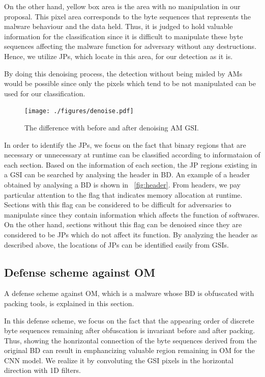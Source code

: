 \documentclass{ieeeaccess}
\begin{document}
On the other hand, yellow box area is the area with no manipulation in our proposal.
This pixel area corresponds to the byte sequences that represents the malware behaviour and the data held.
Thus, it is judged to hold valuable information for the classification since it is difficult to manipulate these byte sequences affecting the malware function for adversary without any destructions.
Hence, we utilize JPs, which locate in this area, for our detection as it is.

By doing this denoising process, the detection without being misled by AMs would be possible since only the pixels which tend to be not manipulated can be used for our classification.

\begin{figure}[h]
 \centering
 \texttt{[image: ./figures/denoise.pdf]}
 \caption{The difference with before and after denoising AM GSI.} 
 \label{fig:denoise}
\end{figure}

In order to identify the JPs, we focus on the fact that binary regions that are necessary or unnecessary at runtime can be classified according to informataion of each section.
Based on the information of each section, the JP regions existing in a GSI can be searched by analysing the header in BD.
An example of a header obtained by analysing a BD is shown in \figurename~\ref{fig:header}.
From headers, we pay particular attention to the flag that indicates memory allocation at runtime.
Sections with this flag can be considered to be difficult for adversaries to manipulate since they contain information which affects the function of softwares.
On the other hand, sections without this flag can be denoised since they are considered to be JPs which do not affect its function.
By analyzing the header as described above, the locations of JPs can be identified easily from GSIs.

\subsection{Defense scheme against OM}
A defense scheme against OM, which is a malware whose BD is obfuscated with packing tools, is explained in this section.

In this defense scheme, we focus on the fact that the appearing order of discrete byte sequences remaining after obfuscation is invariant before and after packing.
Thus, showing the honrizontal connection of the byte sequences derived from the original BD can result in emphancizing valuable region remaining in OM for the CNN model.
We realize it by convoluting the GSI pixels in the horizontal direction with 1D filters.
\end{document}
